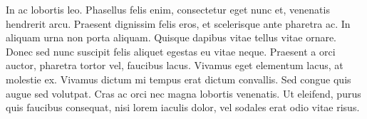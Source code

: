 \documentclass{article}
\begin{document}
In ac lobortis leo. Phasellus felis enim, consectetur eget nunc et, venenatis hendrerit arcu. Praesent dignissim felis eros, et scelerisque ante pharetra ac. In aliquam urna non porta aliquam. Quisque dapibus vitae tellus vitae ornare. Donec sed nunc suscipit felis aliquet egestas eu vitae neque. Praesent a orci auctor, pharetra tortor vel, faucibus lacus. Vivamus eget elementum lacus, at molestie ex. Vivamus dictum mi tempus erat dictum convallis. Sed congue quis augue sed volutpat. Cras ac orci nec magna lobortis venenatis. Ut eleifend, purus quis faucibus consequat, nisi lorem iaculis dolor, vel sodales erat odio vitae risus. 
\end{document}
